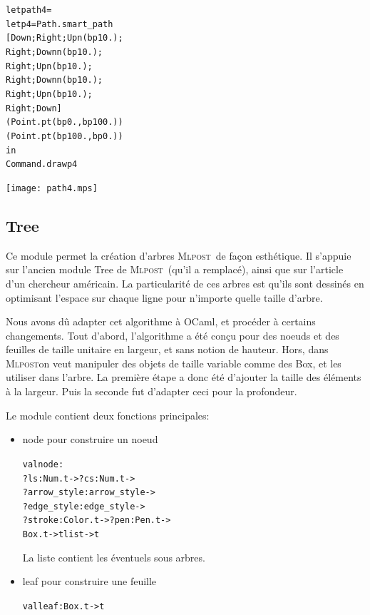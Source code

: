 \documentclass[a4paper,12pt]{article}
\newcommand{\mlpost}{\textsc{Mlpost}}
\begin{document}
\bigskip
\begin{minipage}{0.5\linewidth}
  \begin{alltt}
    let path4 = 
    let p4 = Path.smart_path 
    [Down;Right;Upn (bp 10.);
      Right;Downn (bp 10.);
      Right;Upn (bp 10.);
      Right;Downn (bp 10.);
      Right;Upn (bp 10.);
      Right;Down]
    (Point.pt (bp 0.,bp 100.)) 
    (Point.pt (bp 100.,bp 0.))
    in
    Command.draw p4
  \end{alltt}
\end{minipage}
\begin{minipage}{0.5\linewidth}
\begin{center}
\texttt{[image: path4.mps]}
\end{center}
\end{minipage}


\subsection{Tree}
Ce module permet la création d'arbres \mlpost\ de façon esthétique.
Il s'appuie sur l'ancien module Tree de \mlpost\ (qu'il a remplacé), ainsi que sur l'article d'un chercheur américain. \cite{tree}
La particularité de ces arbres est qu'ils sont dessinés en optimisant l'espace sur chaque ligne pour n'importe quelle taille d'arbre.

Nous avons dû adapter cet algorithme à OCaml, et procéder à certains changements. Tout d'abord, l'algorithme a été conçu pour des noeuds et des feuilles de taille unitaire en largeur, et sans notion de hauteur. Hors, dans \mlpost on veut manipuler des objets de taille variable comme des Box, et les utiliser dans l'arbre. La première étape a donc été d'ajouter la taille des éléments à la largeur. Puis la seconde fut d'adapter ceci pour la profondeur.

Le module contient deux fonctions principales:
\begin{itemize}
\item node pour construire un noeud
  \begin{alltt}
    val node : 
    ?ls:Num.t -> ?cs:Num.t -> 
    ?arrow_style:arrow_style -> 
    ?edge_style:edge_style -> 
    ?stroke:Color.t -> ?pen:Pen.t ->
    Box.t -> t list -> t
  \end{alltt}
  La liste contient les éventuels sous arbres.~\\
\item leaf pour construire une feuille
  \begin{alltt}
    val leaf : Box.t -> t
  \end{alltt}
\end{itemize}
\end{document}
